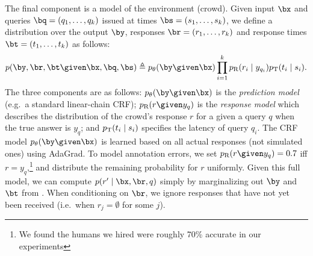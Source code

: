The final component is a model of the environment (crowd).
Given input $\bx$ and queries $\bq = (q_1, \dots, q_k)$ issued at times $\bs = (s_1, \dots, s_k)$,
we define a distribution over the output $\by$, responses $\br = (r_1, \dots, r_k)$
and response times $\bt = (t_1, \dots, t_k)$ as follows:
\begin{align}
  \label{eqn:dynamics}
p(\by, \br, \bt \given \bx, \bq, \bs) \eqdef \p(\by \given \bx) \prod_{i=1}^k \presp(r_i \mid y_{q_i}) \ptime(t_i \mid s_i).
\end{align}
The three components are as follows:
$\p(\by \given \bx)$ is the \emph{prediction model} (e.g.\ a standard linear-chain CRF);
$\presp(r \given y_q)$ is the \emph{response model} which describes the
distribution of the crowd's response $r$ for a given a query $q$ when the true
answer is $y_q$;
and $p_{\text{T}}(t_i \mid s_i)$ specifies the latency of query $q_i$.
The CRF model $\p(\by \given \bx)$ is learned based on all actual responses
(not simulated ones) using AdaGrad.
To model annotation errors, we set $\presp(r \given y_q)
= 0.7$ iff $r = y_q$,\footnote{We found the humans we hired were roughly 70\%
accurate in our experiments} and distribute the remaining probability for $r$
uniformly.
%
%
Given this full model, we can compute $p(r' \mid \bx, \br, q)$ simply by marginalizing out $\by$ and $\bt$ from .
When conditioning on $\br$, we ignore responses that have not yet been received (i.e.\ when $r_j = \emptyset$ for some $j$).

